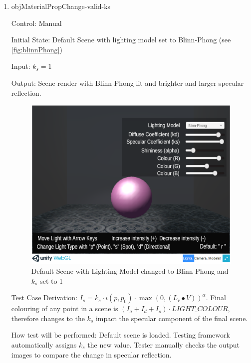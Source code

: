 \documentclass[12pt, titlepage]{article}
\begin{document}
\begin{enumerate}
	\item{objMaterialPropChange-valid-ks\\}
	
	Control: Manual
	
	Initial State: Default Scene with lighting model set to Blinn-Phong (see 
	\ref{fig:blinnPhong})
	
	Input: $k_{s} = 1$
	
	Output: Scene render with Blinn-Phong lit and brighter and larger specular 
	reflection.
	
	\begin{figure}[h]
		\centering
		\includegraphics[scale=0.25]{./images/sphere-lit-blinnphong-ks1}
		\caption{Default Scene with Lighting Model changed to Blinn-Phong and 
		$k_{s}$ set to 1}
		\label{fig:blinnPhong-ks1}
	\end{figure}
	
	Test Case Derivation: $I_{s} = k_{s}\cdot i(p,p_{0}) \cdot \max(0, 
	({L_{r}}\bullet V))^\alpha$. Final colouring of any point in a scene is 
	$(I_{a}+I_{d}+I_{s})\cdot LIGHT\_COLOUR$, therefore changes to the $k_{s}$ 
	impact the specular component of the final scene.
	
	How test will be performed: Default scene is loaded. Testing framework 
	automatically assigns $k_{s}$ the new value. Tester manually checks the 
	output images to compare the change in specular reflection. 
	

\end{enumerate}
\end{document}
